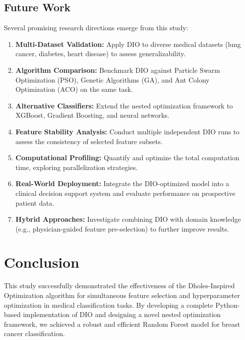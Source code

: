 \documentclass[12pt, a4paper]{article}
\begin{document}
\subsection{Future Work}
Several promising research directions emerge from this study:
\begin{enumerate}
    \item \textbf{Multi-Dataset Validation:} Apply DIO to diverse medical datasets (lung cancer, diabetes, heart disease) to assess generalizability.
    \item \textbf{Algorithm Comparison:} Benchmark DIO against Particle Swarm Optimization (PSO), Genetic Algorithms (GA), and Ant Colony Optimization (ACO) on the same task.
    \item \textbf{Alternative Classifiers:} Extend the nested optimization framework to XGBoost, Gradient Boosting, and neural networks.
    \item \textbf{Feature Stability Analysis:} Conduct multiple independent DIO runs to assess the consistency of selected feature subsets.
    \item \textbf{Computational Profiling:} Quantify and optimize the total computation time, exploring parallelization strategies.
    \item \textbf{Real-World Deployment:} Integrate the DIO-optimized model into a clinical decision support system and evaluate performance on prospective patient data.
    \item \textbf{Hybrid Approaches:} Investigate combining DIO with domain knowledge (e.g., physician-guided feature pre-selection) to further improve results.
\end{enumerate}

\section{Conclusion}

This study successfully demonstrated the effectiveness of the Dholes-Inspired Optimization algorithm for simultaneous feature selection and hyperparameter optimization in medical classification tasks. By developing a complete Python-based implementation of DIO and designing a novel nested optimization framework, we achieved a robust and efficient Random Forest model for breast cancer classification.
\end{document}
